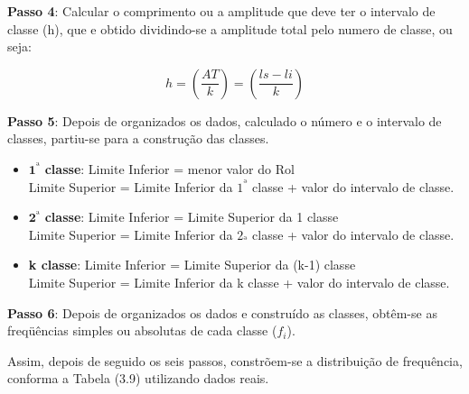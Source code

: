 \textbf{Passo 4}: Calcular o comprimento ou a amplitude que deve ter o intervalo de classe (h), que e obtido dividindo-se a amplitude total pelo numero de classe, ou seja:


$$ h = \left(\frac{AT}{k} \right)= \left(\frac{ls-li}{k} \right)$$


\textbf{Passo 5}: Depois de organizados os dados, calculado o número e o intervalo de classes, partiu-se para a construção das classes.


\begin{itemize}
  \item $\textbf{1}^{ª}$ \textbf{classe}: Limite Inferior = menor valor do Rol\\
  Limite Superior = Limite Inferior da $1^{ª}$ classe + valor do intervalo de classe.
  \item $\textbf{2}^{ª}$ \textbf{classe}: Limite Inferior = Limite Superior da 1 classe\\
  Limite Superior = Limite Inferior da $2_{ª}$ classe + valor do intervalo de classe.
  \item \textbf{k classe}: Limite Inferior = Limite Superior da (k-1) classe\\
               Limite Superior = Limite Inferior da k classe + valor do intervalo de classe.
\end{itemize}



\textbf{Passo 6}: Depois de organizados os dados e construído as classes, obtêm-se as freqüências simples ou absolutas de cada classe ($f_{i}$).\vskip0.3cm

Assim, depois de seguido os seis passos, constrõem-se a distribuição de frequência, conforma a Tabela (3.9) utilizando dados reais.


